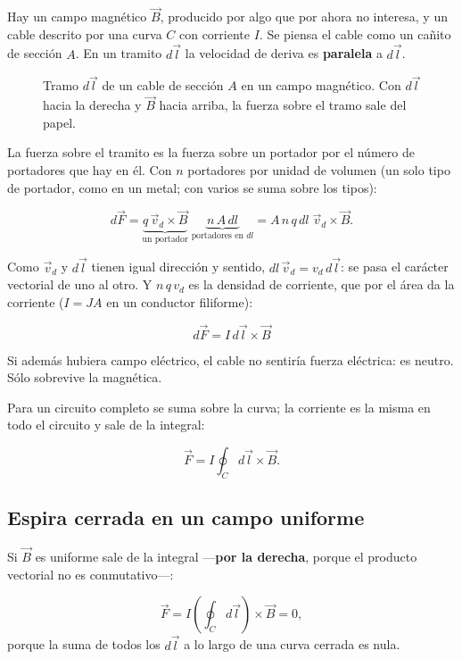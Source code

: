 \documentclass[12pt,a4paper]{article}
\begin{document}
Hay un campo magnético $\vec B$, producido por algo que por ahora no interesa, y
un cable descrito por una curva $C$ con corriente $I$. Se piensa el cable como
un cañito de sección $A$. En un tramito $d\vec l$ la velocidad de deriva es
\textbf{paralela} a $d\vec l$.

\begin{figure}[H]
  \centering
  
  \caption{Tramo $d\vec l$ de un cable de sección $A$ en un campo magnético. Con $d\vec l$ hacia la derecha y $\vec B$ hacia arriba, la fuerza sobre el tramo sale del papel.}
\end{figure}

La fuerza sobre el tramito es la fuerza sobre un portador por el número de
portadores que hay en él. Con $n$ portadores por unidad de volumen (un solo
tipo de portador, como en un metal; con varios se suma sobre los tipos):

\[
d\vec F = \underbrace{q\,\vec v_d\times\vec B}_{\text{un portador}}\;
\underbrace{n\,A\,dl}_{\text{portadores en } dl}
= A\,n\,q\,dl\;\vec v_d\times\vec B .
\]

Como $\vec v_d$ y $d\vec l$ tienen igual dirección y sentido,
$dl\,\vec v_d = v_d\,d\vec l$: se pasa el carácter vectorial de uno al otro.
Y $n\,q\,v_d$ es la densidad de corriente, que por el área da la corriente
($I = JA$ en un conductor filiforme):

\begin{keybox}
\[
\boxed{\ d\vec F = I\,d\vec l\times\vec B\ }
\]
\end{keybox}

\begin{notebox}
Si además hubiera campo eléctrico, el cable no sentiría fuerza eléctrica: es
neutro. Sólo sobrevive la magnética.
\end{notebox}

Para un circuito completo se suma sobre la curva; la corriente es la misma en
todo el circuito y sale de la integral:

\[
\vec F = I\oint_C d\vec l\times\vec B .
\]

\subsection{Espira cerrada en un campo uniforme}

Si $\vec B$ es uniforme sale de la integral ---\textbf{por la derecha}, porque el
producto vectorial no es conmutativo---:

\[
\vec F = I\left(\oint_C d\vec l\right)\times\vec B = 0,
\]
porque la suma de todos los $d\vec l$ a lo largo de una curva cerrada es nula.
\end{document}
